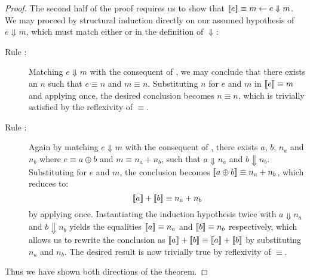 \begin{proof}
\noindent The second half of the proof requires us to show that $\sb[e]
\equiv m \leftarrow e \Downarrow m$. We may proceed by structural induction
directly on our assumed hypothesis of $e \Downarrow m$, which must match
either  or  in the definition of
$\Downarrow$:
\begin{description}
\item[Rule :]%
Matching $e \Downarrow m$ with the consequent of , we may
conclude that there exists an $n$ such that $e \equiv n$ and $m \equiv n$.
Substituting $n$ for $e$ and $m$ in $\sb[e] \equiv m$ and applying
 once, the desired conclusion becomes $n \equiv n$, which
is trivially satisfied by the reflexivity of $\equiv$.
\item[Rule :]%
Again by matching $e \Downarrow m$ with the consequent of ,
there exists $a$, $b$, $n_a$ and $n_b$ where $e \equiv a \oplus b$ and $m
\equiv n_a + n_b$, such that $a \Downarrow n_a$ and $b \Downarrow n_b$.
Substituting for $e$ and $m$, the conclusion becomes $\sb[a \oplus b] \equiv
n_a + n_b$, which reduces to:
\[
	\sb[a] + \sb[b] \equiv n_a + n_b
\]
by applying  once. Instantiating the induction
hypothesis twice with $a \Downarrow n_a$ and $b \Downarrow n_b$ yields the
equalities $\sb[a] \equiv n_a$ and $\sb[b] \equiv n_b$ respectively, which
allows us to rewrite the conclusion as $\sb[a] + \sb[b] \equiv \sb[a]
+ \sb[b]$ by substituting $n_a$ and $n_b$. The desired result is now
trivially true by reflexivity of $\equiv$.
\end{description}

\noindent Thus we have shown both directions of the theorem.
\end{proof}



